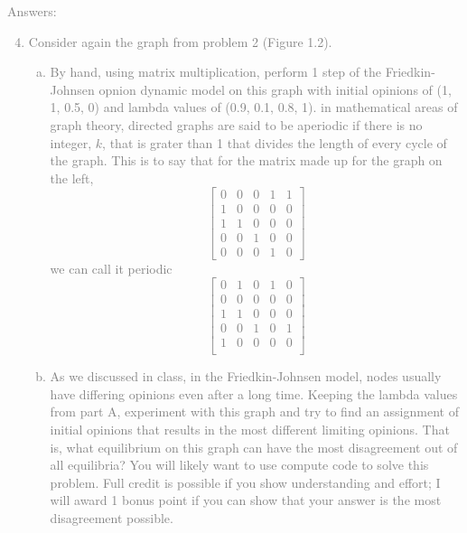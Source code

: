 \documentclass[11pt]{article}
\begin{document}
\textcolor{gray}{
Answers:
\begin{enumerate}
	\setcounter{enumi}{3}
	\item Consider again the graph from problem 2 (Figure 1.2).
	\begin{enumerate}[(a)]
		\item By hand, using matrix multiplication, perform 1 step of the Friedkin-Johnsen opnion dynamic model on this graph with initial opinions of (1, 1, 0.5, 0) and lambda values of (0.9, 0.1, 0.8, 1).
in mathematical areas of graph theory, directed graphs are said to be aperiodic if there is no integer, $k$, that is grater than 1 that divides the length of every cycle of the graph.  This is to say that for the matrix made up for the graph on the left,
		$$\begin{bmatrix} 
			0 & 0 & 0 & 1 & 1 \\
			1 & 0 & 0 & 0 & 0 \\
			1 & 1 & 0 & 0 & 0 \\
			0 & 0 & 1 & 0 & 0 \\
			0 & 0 & 0 & 1 & 0
		\end{bmatrix}$$
we can call it periodic 
		$$\begin{bmatrix} 
			0 & 1 & 0 & 1 & 0 \\
			0 & 0 & 0 & 0 & 0 \\
			1 & 1 & 0 & 0 & 0 \\
			0 & 0 & 1 & 0 & 1 \\
			1 & 0 & 0 & 0 & 0 \\
		\end{bmatrix}$$
		\item As we discussed in class, in the Friedkin-Johnsen model, nodes usually have differing opinions even after a long time. Keeping the lambda values from part A, experiment with this graph and try to find an assignment of initial opinions that results in the most different limiting opinions. That is, what equilibrium on this graph can have the most disagreement out of all equilibria? You will likely want to use compute code to solve this problem. Full credit is possible if you show understanding and effort; I will award 1 bonus point if you can show that your answer is the most disagreement possible.
	\end{enumerate}
\end{enumerate}
}
\end{document}
